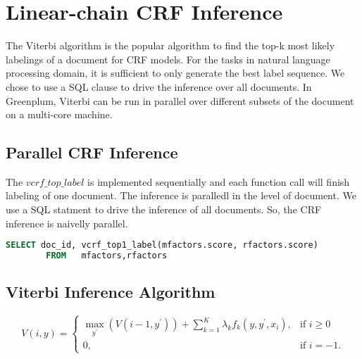 \section{Linear-chain CRF Inference}
The Viterbi algorithm \cite{DBLP:journals/scholarpedia/Viterbi09} is the popular algorithm to find the top-k most likely labelings of a document for CRF models. 
For the tasks in natural language processing domain, it is sufficient to only generate the best label sequence.  
We chose to use a SQL clause to drive the inference over all documents. 
In Greenplum, Viterbi can be run in parallel over different subsets of the document on a multi-core machine.

\subsection{Parallel CRF Inference}
The $vcrf\_top\_label$ is implemented sequentially and each function call will finish labeling of one document. 
The inference is paralledl in the level of document. We use a SQL statment to drive the inference of all documents.
So, the CRF inference is naivelly parallel. 
\begin{lstlisting}[language=SQL,gobble=4]
        SELECT doc_id, vcrf_top1_label(mfactors.score, rfactors.score)
        FROM   mfactors,rfactors
\end{lstlisting}

\subsection{Viterbi Inference Algorithm}
\[
V(i,y) =
\begin{cases}
 \max_{y^\prime}(V(i-1,y^\prime)) + \textstyle \sum_{k=1}^K \lambda_kf_k(y,y^\prime,x_i), & \text{if } i\ge0 \\
 0, & \text{if } i=-1.
\end{cases}
\]

